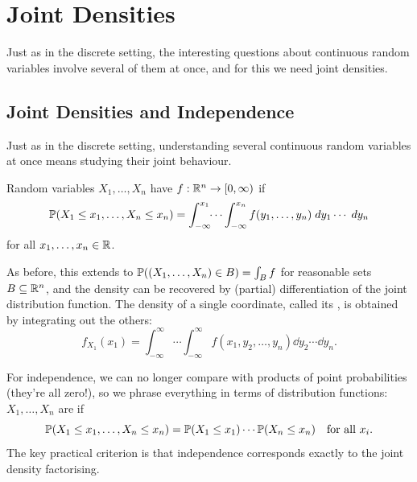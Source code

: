 \documentclass[a4paper]{scrartcl}
\begin{document}
\section{Joint Densities}

Just as in the discrete setting, the interesting questions about continuous random variables involve several of them at once, and for this we need joint densities.

\subsection{Joint Densities and Independence}

Just as in the discrete setting, understanding several continuous random variables at once means studying their joint behaviour.

\begin{definition}
	Random variables $X_1, \dots, X_n$ have  $f: \mathbb{R}^n \rightarrow [0, \infty)$ if
	$$
	\mathbb{P}(X_1 \leq x_1, \dots, X_n \leq x_n) = \int_{-\infty}^{x_1} \!\!\cdots \int_{-\infty}^{x_n} f(y_1, \dots, y_n) \; d y_1 \cdots \; d y_n
	$$
	for all $x_1, \dots, x_n \in \mathbb{R}$.
\end{definition}

As before, this extends to $\mathbb{P}((X_1, \dots, X_n) \in B) = \int_B f$ for reasonable sets $B \subseteq \mathbb{R}^n$, and the density can be recovered by (partial) differentiation of the joint distribution function. The density of a single coordinate, called its , is obtained by integrating out the others:
$$
f_{X_1}(x_1) = \int_{-\infty}^{\infty}\!\!\cdots\int_{-\infty}^{\infty} f(x_1, y_2, \dots, y_n) \dd y_2 \cdots \dd y_n.
$$

For independence, we can no longer compare with products of point probabilities (they're all zero!), so we phrase everything in terms of distribution functions: $X_1, \dots, X_n$ are  if
$$
\mathbb{P}(X_1 \leq x_1, \dots, X_n \leq x_n) = \mathbb{P}(X_1 \leq x_1) \cdots \mathbb{P}(X_n \leq x_n) \quad \text{for all } x_i.
$$
The key practical criterion is that independence corresponds exactly to the joint density factorising.
\end{document}
